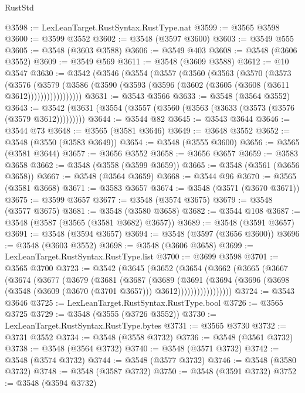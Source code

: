 \begin{lexlean}{RustStd}
\begin{coremodule}
@3598 := LexLeanTarget.RustSyntax.RustType.nat
@3599 := @3565 @3598
@3600 := @3599 @3552
@3602 := @3548 (@3597 @3600)
@3603 := @3549 @555
@3605 := @3548 (@3603 @3588)
@3606 := @3549 @403
@3608 := @3548 (@3606 @3552)
@3609 := @3549 @569
@3611 := @3548 (@3609 @3588)
@3612 := @10 @3547
@3630 := @3542
    (@3546
      (@3554
        (@3557
          (@3560
            (@3563
              (@3570
                (@3573
                  (@3576
                    (@3579
                      (@3586 (@3590 (@3593 (@3596 (@3602 (@3605 (@3608 (@3611 @3612)))))))))))))))))
@3631 := @3543 @3566
@3633 := @3548 (@3564 @3552)
@3643 := @3542 (@3631 (@3554 (@3557 (@3560 (@3563 (@3633 (@3573 (@3576 (@3579 @3612)))))))))
@3644 := @3544 @82
@3645 := @3543 @3644
@3646 := @3544 @73
@3648 := @3565 (@3581 @3646)
@3649 := @3648 @3552
@3652 := @3548 (@3550 (@3583 @3649))
@3654 := @3548 (@3555 @3600)
@3656 := @3565 (@3581 @3644)
@3657 := @3656 @3552
@3658 := @3656 @3657
@3659 := @3583 @3658
@3662 := @3548 (@3558 (@3599 @3659))
@3665 := @3548 (@3561 (@3656 @3658))
@3667 := @3548 (@3564 @3659)
@3668 := @3544 @96
@3670 := @3565 (@3581 @3668)
@3671 := @3583 @3657
@3674 := @3548 (@3571 (@3670 @3671))
@3675 := @3599 @3657
@3677 := @3548 (@3574 @3675)
@3679 := @3548 (@3577 @3675)
@3681 := @3548 (@3580 @3658)
@3682 := @3544 @108
@3687 := @3548 (@3587 (@3565 (@3581 @3682) @3657))
@3689 := @3548 (@3591 @3657)
@3691 := @3548 (@3594 @3657)
@3694 := @3548 (@3597 (@3656 @3600))
@3696 := @3548 (@3603 @3552)
@3698 := @3548 (@3606 @3658)
@3699 := LexLeanTarget.RustSyntax.RustType.list
@3700 := @3699 @3598
@3701 := @3565 @3700
@3723 := @3542
    (@3645
      (@3652
        (@3654
          (@3662
            (@3665
              (@3667
                (@3674
                  (@3677
                    (@3679
                      (@3681
                        (@3687
                          (@3689
                            (@3691
                              (@3694
                                (@3696
                                  (@3698 (@3548 (@3609 (@3670 (@3701 @3657))) @3612)))))))))))))))))
@3724 := @3543 @3646
@3725 := LexLeanTarget.RustSyntax.RustType.bool
@3726 := @3565 @3725
@3729 := @3548 (@3555 (@3726 @3552))
@3730 := LexLeanTarget.RustSyntax.RustType.bytes
@3731 := @3565 @3730
@3732 := @3731 @3552
@3734 := @3548 (@3558 @3732)
@3736 := @3548 (@3561 @3732)
@3738 := @3548 (@3564 @3732)
@3740 := @3548 (@3571 @3732)
@3742 := @3548 (@3574 @3732)
@3744 := @3548 (@3577 @3732)
@3746 := @3548 (@3580 @3732)
@3748 := @3548 (@3587 @3732)
@3750 := @3548 (@3591 @3732)
@3752 := @3548 (@3594 @3732)

\end{coremodule}
\end{lexlean}
